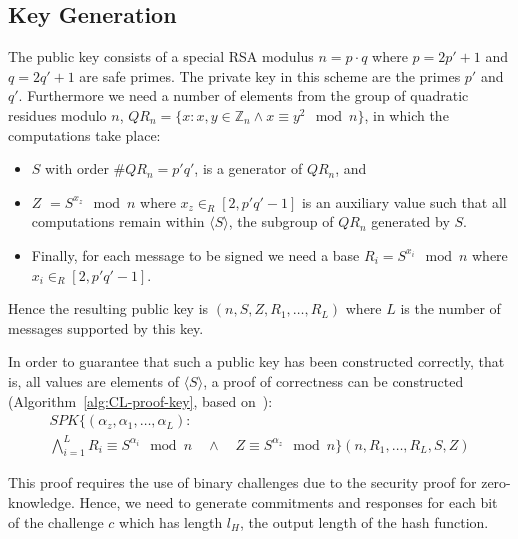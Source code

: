 \subsection{Key Generation}\label{sec:cl_keygen}

The public key consists of a special RSA modulus $n = p \cdot q$ where
$p = 2p' + 1$ and $q = 2q' + 1$ are safe primes. The private key in this scheme
are the primes $p'$ and $q'$. Furthermore we need a number of elements from the
group of quadratic residues modulo $n$,
$QR_n = \{ x : x,y \in \mathbb{Z}_n \land x \equiv y^2 \mod n \}$, in which
the computations take place:
\begin{itemize}
  \item $S$ with order $\#QR_n = p'q'$, is a generator of $QR_n$, and
  \item $Z$ $= S^{x_z} \mod n$ where $x_z \in_R [2, p'q' - 1]$ is an
    auxiliary value such that all computations remain within
    $\langle S \rangle$, the subgroup of $QR_n$ generated by $S$.
  \item Finally, for each message to be signed we need a base
    $R_i = S^{x_i} \mod n$ where $x_i \in_R [2, p'q' - 1]$.
\end{itemize}
Hence the resulting public key is $(n, S, Z, R_1, \dots, R_L)$ where $L$ is the
number of messages supported by this key.

In order to guarantee that such a public key has been constructed correctly,
that is, all values are elements of $\langle S \rangle$, a proof of
correctness can be constructed (Algorithm~\ref{alg:CL-proof-key}, based
on~\cite[Appendix A]{BrickellCC2004}):
\begin{multline*}
  SPK \{ (\alpha_z, \alpha_1, \dots, \alpha_L) : \\
  \bigwedge_{i = 1}^{L} R_i \equiv S^{\alpha_i} \mod n
  \quad\land\quad
  Z \equiv S^{\alpha_z} \mod n
  \} (n, R_1, \dots, R_L, S, Z)
\end{multline*}

This proof requires the use of binary challenges due to the security proof for
zero-knowledge. Hence, we need to generate commitments and responses for each
bit of the challenge $c$ which has length $l_H$, the output length of the hash
function.
%
%

